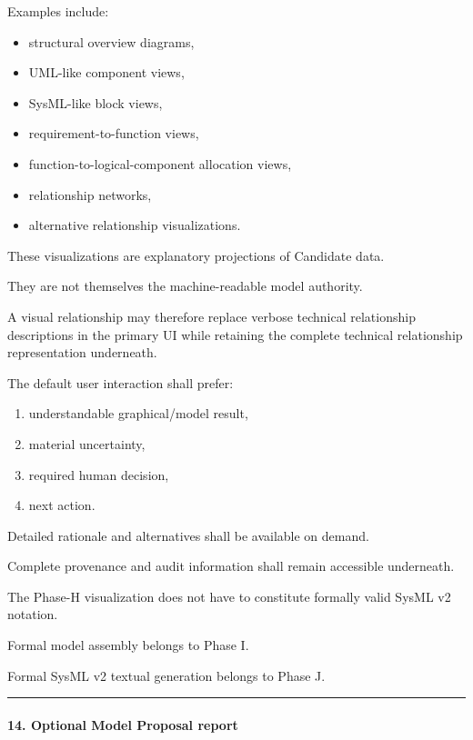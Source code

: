 Examples include:

\begin{itemize}
\tightlist
\item
  structural overview diagrams,
\item
  UML-like component views,
\item
  SysML-like block views,
\item
  requirement-to-function views,
\item
  function-to-logical-component allocation views,
\item
  relationship networks,
\item
  alternative relationship visualizations.
\end{itemize}

These visualizations are explanatory projections of Candidate data.

They are not themselves the machine-readable model authority.

A visual relationship may therefore replace verbose technical relationship descriptions in the primary UI while retaining the complete technical relationship representation underneath.

The default user interaction shall prefer:

\begin{enumerate}
\def\labelenumi{\arabic{enumi}.}
\tightlist
\item
  understandable graphical/model result,
\item
  material uncertainty,
\item
  required human decision,
\item
  next action.
\end{enumerate}

Detailed rationale and alternatives shall be available on demand.

Complete provenance and audit information shall remain accessible underneath.

The Phase-H visualization does not have to constitute formally valid SysML v2 notation.

Formal model assembly belongs to Phase I.

Formal SysML v2 textual generation belongs to Phase J.

\begin{center}\rule{0.5\linewidth}{0.5pt}\end{center}

\hypertarget{14-optional-model-proposal-report}{%
\paragraph{14. Optional Model Proposal report}\label{14-optional-model-proposal-report}}

